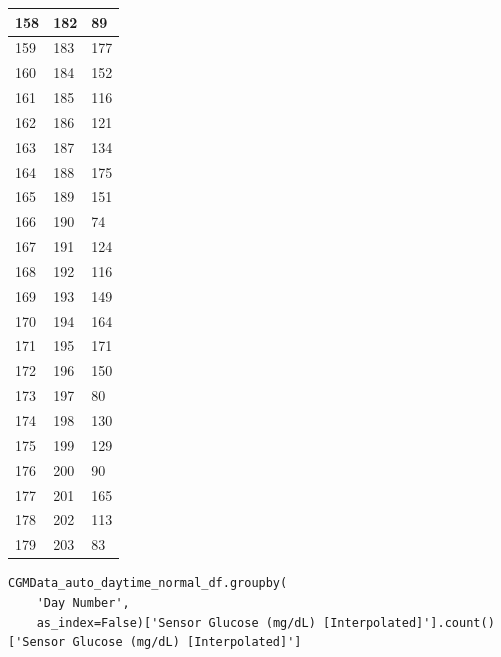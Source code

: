 \begin{tabular}{p{}p{}p{}}
\hline
158 & 182 & 89 \\
\hline
159 & 183 & 177 \\
\hline
160 & 184 & 152 \\
\hline
161 & 185 & 116 \\
\hline
162 & 186 & 121 \\
\hline
163 & 187 & 134 \\
\hline
164 & 188 & 175 \\
\hline
165 & 189 & 151 \\
\hline
166 & 190 & 74 \\
\hline
167 & 191 & 124 \\
\hline
168 & 192 & 116 \\
\hline
169 & 193 & 149 \\
\hline
170 & 194 & 164 \\
\hline
171 & 195 & 171 \\
\hline
172 & 196 & 150 \\
\hline
173 & 197 & 80 \\
\hline
174 & 198 & 130 \\
\hline
175 & 199 & 129 \\
\hline
176 & 200 & 90 \\
\hline
177 & 201 & 165 \\
\hline
178 & 202 & 113 \\
\hline
179 & 203 & 83 \\
\hline
\bottomrule
\end{tabular}

\bigskip

\begin{verbatim}
CGMData_auto_daytime_normal_df.groupby(
    'Day Number',
    as_index=False)['Sensor Glucose (mg/dL) [Interpolated]'].count()['Sensor Glucose (mg/dL) [Interpolated]']
\end{verbatim}

